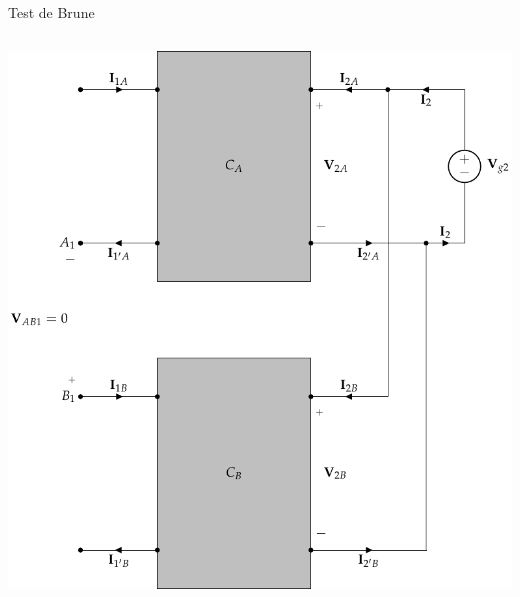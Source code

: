 \documentclass[aspectratio=169, usenames,svgnames,dvipsnames]{beamer}
\begin{document}
\begin{frame}[label={sec:org8e219e8},plain]{Test de Brune}
\begin{columns}
\begin{column}{0.5\columnwidth}
\begin{center}
\includegraphics[height=0.8\textheight]{../figs/serie-paralelo-brune-salida.pdf}
\end{center}
\end{column}
\end{columns}
\end{frame}
\end{document}

